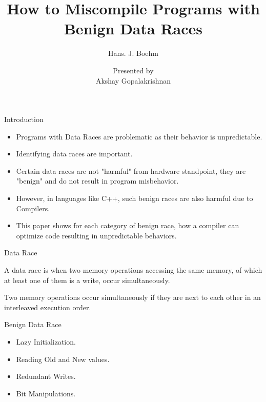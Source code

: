 \documentclass[xcolor=dvipsnames, notes]{beamer}
\title{How to Miscompile Programs with Benign Data Races}
\subtitle{Hans. J. Boehm}
\author{Presented by \\ Akshay Gopalakrishnan}
\begin{document}
    \begin{frame}

        \maketitle

    \end{frame}

    \begin{frame}{Introduction}
        
        \begin{itemize}
            \item Programs with Data Races are problematic as their behavior is unpredictable.
            \item Identifying data races are important.
            \item Certain data races are not "harmful" from hardware standpoint, they are "benign" and do not result in program misbehavior. 
            \item However, in languages like C++, such benign races are also harmful due to Compilers.
            \item This paper shows for each category of benign race, how a compiler can optimize code resulting in unpredictable behaviors.
        \end{itemize}

    \end{frame}

    \begin{frame}{Data Race}
        
        \begin{center}
            A data race is when two memory operations accessing the same memory, of which at least one of them is a write, occur simultaneously.
        \end{center}

        \begin{center}
            Two memory operations occur simultaneously if they are next to each other in an interleaved execution order.
        \end{center}

    \end{frame}

    \begin{frame}{Benign Data Race}
        
        \begin{itemize}
            \item Lazy Initialization. 
            \item Reading Old and New values.
            \item Redundant Writes.
            \item Bit Manipulations.
        \end{itemize}
        
    \end{frame}
\end{document}
